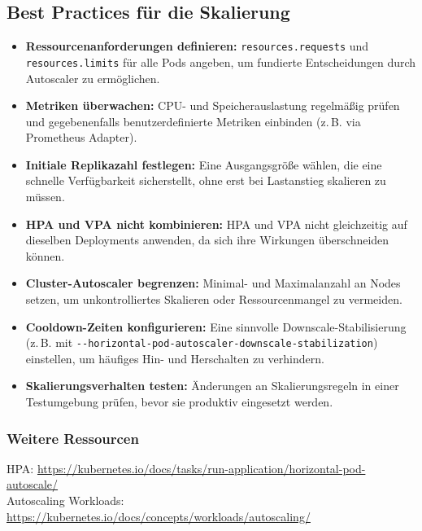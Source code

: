 \subsection{Best Practices für die Skalierung}
\begin{itemize}
  \item \textbf{Ressourcenanforderungen definieren:} \texttt{resources.requests} und \texttt{resources.limits} für alle Pods angeben, um fundierte Entscheidungen durch Autoscaler zu ermöglichen.

  \item \textbf{Metriken überwachen:} CPU- und Speicherauslastung regelmäßig prüfen und gegebenenfalls benutzerdefinierte Metriken einbinden (z.\,B. via Prometheus Adapter).

  \item \textbf{Initiale Replikazahl festlegen:} Eine Ausgangsgröße wählen, die eine schnelle Verfügbarkeit sicherstellt, ohne erst bei Lastanstieg skalieren zu müssen.

  \item \textbf{HPA und VPA nicht kombinieren:} HPA und VPA nicht gleichzeitig auf dieselben Deployments anwenden, da sich ihre Wirkungen überschneiden können.

  \item \textbf{Cluster-Autoscaler begrenzen:} Minimal- und Maximalanzahl an Nodes setzen, um unkontrolliertes Skalieren oder Ressourcenmangel zu vermeiden.

  \item \textbf{Cooldown-Zeiten konfigurieren:} Eine sinnvolle Downscale-Stabilisierung (z.\,B. mit \texttt{{-}{-}horizontal-pod-autoscaler-downscale-stabilization}) einstellen, um häufiges Hin- und Herschalten zu verhindern.

  \item \textbf{Skalierungsverhalten testen:} Änderungen an Skalierungsregeln in einer Testumgebung prüfen, bevor sie produktiv eingesetzt werden.
\end{itemize}

\subsubsection*{Weitere Ressourcen}
HPA:  
\url{https://kubernetes.io/docs/tasks/run-application/horizontal-pod-autoscale/}\\
Autoscaling Workloads: \url{https://kubernetes.io/docs/concepts/workloads/autoscaling/}
